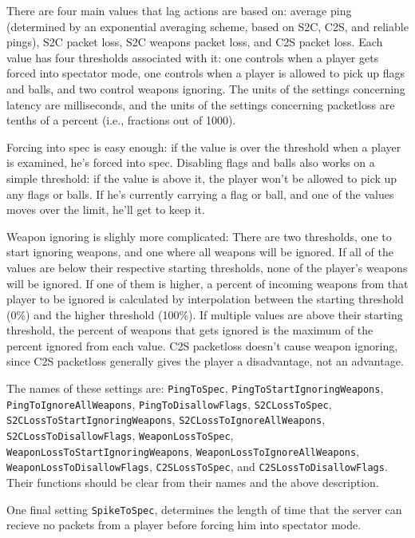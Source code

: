 \documentclass{article}
\begin{document}
There are four main values that lag actions are based on: average ping
(determined by an exponential averaging scheme, based on S2C, C2S, and
reliable pings), S2C packet loss, S2C weapons packet loss, and C2S
packet loss. Each value has four thresholds associated with it: one
controls when a player gets forced into spectator mode, one controls
when a player is allowed to pick up flags and balls, and two control
weapons ignoring. The units of the settings concerning latency are
milliseconds, and the units of the settings concerning packetloss are
tenths of a percent (i.e., fractions out of 1000).

Forcing into spec is easy enough: if the value is over the threshold
when a player is examined, he's forced into spec. Disabling flags and
balls also works on a simple threshold: if the value is above it, the
player won't be allowed to pick up any flags or balls. If he's currently
carrying a flag or ball, and one of the values moves over the limit,
he'll get to keep it.

Weapon ignoring is slighly more complicated: There are two thresholds,
one to start ignoring weapons, and one where all weapons will be
ignored. If all of the values are below their respective starting
thresholds, none of the player's weapons will be ignored. If one of them
is higher, a percent of incoming weapons from that player to be ignored
is calculated by interpolation between the starting threshold (0\%) and
the higher threshold (100\%). If multiple values are above their
starting threshold, the percent of weapons that gets ignored is the
maximum of the percent ignored from each value. C2S packetloss doesn't
cause weapon ignoring, since C2S packetloss generally gives the player a
disadvantage, not an advantage.

The names of these settings are:
\texttt{PingToSpec},
\texttt{PingToStartIgnoringWeapons},
\texttt{PingToIgnoreAllWeapons},
\texttt{PingToDisallowFlags},
\texttt{S2CLossToSpec},
\texttt{S2CLossToStartIgnoringWeapons},
\texttt{S2CLossToIgnoreAllWeapons},
\texttt{S2CLossToDisallowFlags},
\texttt{WeaponLossToSpec},
\texttt{WeaponLossToStartIgnoringWeapons},
\texttt{WeaponLossToIgnoreAllWeapons},
\texttt{WeaponLossToDisallowFlags},
\texttt{C2SLossToSpec},
and
\texttt{C2SLossToDisallowFlags}. Their functions should be clear from
their names and the above description.

One final setting \texttt{SpikeToSpec}, determines the length of time
that the server can recieve no packets from a player before forcing him
into spectator mode.
\end{document}
